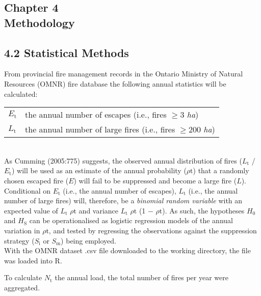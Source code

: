 \documentclass{article}
\begin{document}


\begin{spacing}{1.5}
\phantom
\phantom
\phantom
\phantom
\section*{Chapter 4 \\ \huge{Methodology}}
\phantom
\phantom
\subsection*{4.2 Statistical Methods}

From provincial fire management records in the Ontario Ministry of Natural Resources (OMNR) fire database the following annual statistics will be calculated:\\

\begin{tabular}{ll}
$E_{\mathrm{t}}$     & the annual number of escapes (i.e., fires  $\geq$3 {\it ha})\\
$L_{\mathrm{t}}$     & the annual number of large fires (i.e., fires $\geq$200 {\it ha})\\
\end{tabular}\\

\noindent As Cumming (2005:775) suggests, the observed annual distribution of fires ($L_{\mathrm{t}}$ / $E_{\mathrm{t}}$) will be used as an estimate of the annual probability ($\rho{\mathrm{t}}$) that a randomly chosen escaped fire ($E$) will fail to be suppressed and become a large fire ($L$). \\

Conditional on $E_{\mathrm{t}}$ (i.e., the annual number of escapes), $L_{\mathrm{t}}$ (i.e., the annual number of large fires) will, therefore, be a {\it binomial random variable} with an expected value of $L_{\mathrm{t}}$ $\rho{\mathrm{t}}$ and variance $L_{\mathrm{t}}$ $\rho{\mathrm{t}}$ (1 $-$ $\rho{\mathrm{t}}$). As such, the hypotheses $H_{\mathrm{0}}$ and $H_{\mathrm{S}}$ can be operationalised as logistic regression models of the annual variation in $\rho{\mathrm{t}}$, and tested by regressing the observations against the suppression strategy ($S_{\mathrm{i}}$ or $S_{\mathrm{m}}$) being employed. \\


\noindent With the OMNR dataset .csv file downloaded to the working directory, the file was loaded into R.


\noindent To calculate $N_{\mathrm{t}}$ the annual load, the total number of fires per year were aggregated.



\end{spacing}
\end{document}
